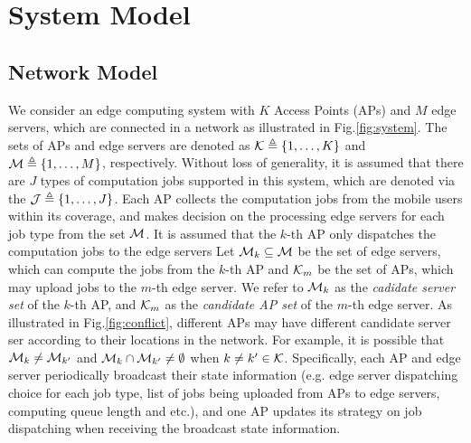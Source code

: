 \section{System Model}
\subsection{Network Model}
We consider an edge computing system with $K$ Access Points (APs) and $M$ edge servers, which are connected in a network as illustrated in Fig.\ref{fig:system}.
The sets of APs and edge servers are denoted as $\mathcal{K} \triangleq \{1,\dots,K\}$ and $\mathcal{M} \triangleq \{1,\dots,M\}$, respectively.
Without loss of generality, it is assumed that there are $J$ types of computation jobs supported in this system, which are denoted via the $\mathcal{J} \triangleq \{1,\dots,J\}$.
Each AP collects the computation jobs from the mobile users within its coverage, and makes decision on the processing edge servers for each job type from the set $\mathcal{M}$.
It is assumed that the $k$-th AP only dispatches the computation jobs to the edge servers 
Let $\mathcal{M}_{k} \subseteq \mathcal{M}$ be the set of edge servers, which can compute the jobs from the $k$-th AP and $\mathcal{K}_{m}$ be the set of APs, which may upload jobs to the $m$-th edge server.
We refer to $\mathcal{M}_{k}$ as the \emph{cadidate server set} of the $k$-th AP, and $\mathcal{K}_{m}$ as the \emph{candidate AP set} of the $m$-th edge server.
As illustrated in Fig.\ref{fig:conflict}, different APs may have different candidate server ser according to their locations in the network.
For example, it is possible that $\mathcal{M}_{k} \neq \mathcal{M}_{k'}$ and $\mathcal{M}_{k} \cap \mathcal{M}_{k'} \neq \emptyset$ when $k \neq k' \in \mathcal{K}$.
Specifically, each AP and edge server periodically broadcast their state information (e.g. edge server dispatching choice for each job type, list of jobs being uploaded from APs to edge servers, computing queue length and etc.), and one AP updates its strategy on job dispatching when receiving the broadcast state information.

